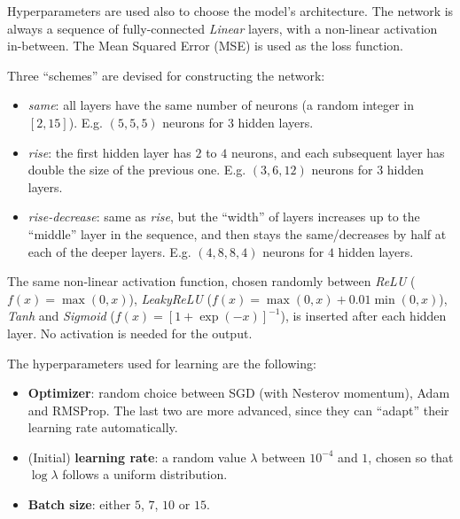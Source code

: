 \documentclass[11pt,a4paper]{scrartcl}
\newcommand{\q}[1]{``#1''}
\begin{document}
Hyperparameters are used also to choose the model's architecture. The network is always a sequence of fully-connected \textit{Linear} layers, with a non-linear activation in-between. The Mean Squared Error (MSE) is used as the loss function.

\medskip

Three \q{schemes} are devised for constructing the network:
\begin{itemize}
    \item \textit{same}: all layers have the same number of neurons (a random integer in $[2, 15]$). E.g. $(5, 5, 5)$ neurons for $3$ hidden layers.
    \item \textit{rise}: the first hidden layer has $2$ to $4$ neurons, and each subsequent layer has double the size of the previous one. E.g. $(3, 6, 12)$ neurons for $3$ hidden layers.
    \item \textit{rise-decrease}: same as \textit{rise}, but the \q{width} of layers increases up to the \q{middle} layer in the sequence, and then stays the same/decreases by half at each of the deeper layers. E.g. $(4, 8, 8, 4)$ neurons for $4$ hidden layers.
\end{itemize}
The same non-linear activation function, chosen randomly between \textit{ReLU} ($f(x) = \max(0, x)$), \textit{LeakyReLU} ($f(x) = \max(0,x) + 0.01 \min(0,x)$), \textit{Tanh} and \textit{Sigmoid} ($f(x) = [1+\exp(-x)]^{-1}$), is inserted after each hidden layer. No activation is needed for the output.

\medskip

The hyperparameters used for learning are the following:
\begin{itemize}
    \item \textbf{Optimizer}: random choice between SGD (with Nesterov momentum), Adam and RMSProp. The last two are more advanced, since they can \q{adapt} their learning rate automatically.  
    \item (Initial) \textbf{learning rate}: a random value $\lambda$ between $10^{-4}$ and $1$, chosen so that $\log \lambda$ follows a uniform distribution.
    \item \textbf{Batch size}: either $5$, $7$, $10$ or $15$.
\end{itemize}
\end{document}
